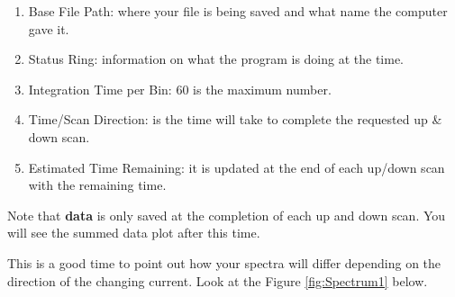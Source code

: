\documentclass{../lab}
\begin{document}
\begin{enumerate}
    \item Base File Path: where your file is being saved and what name the computer gave it.

    \item Status Ring: information on what the program is doing at the time.

    \item Integration Time per Bin: 60 is the maximum number.

    \item Time/Scan Direction: is the time will take to complete the requested up \& down scan.

    \item Estimated Time Remaining: it is updated at the end of each up/down scan with the remaining time.

\end{enumerate}

Note that \textbf{data} is only saved at the completion of each up and down scan. You will see the summed data plot after this time.

This is a good time to point out how your spectra will differ depending on the direction of the changing current. Look at the Figure \ref{fig:Spectrum1} below.
\end{document}
